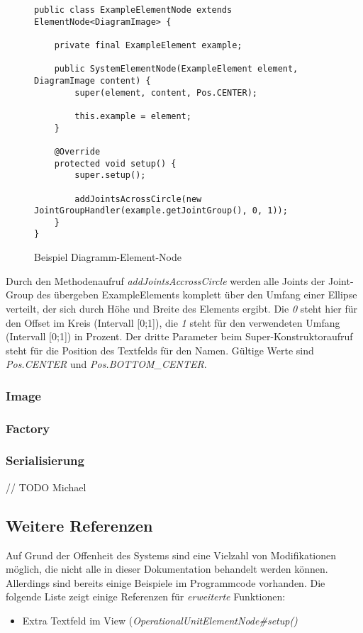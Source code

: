 \begin{figure}[h!]
	\centering
	\begin{lstlisting}
public class ExampleElementNode extends ElementNode<DiagramImage> {

    private final ExampleElement example;

    public SystemElementNode(ExampleElement element, DiagramImage content) {
        super(element, content, Pos.CENTER);

        this.example = element;
    }

    @Override
    protected void setup() {
        super.setup();

        addJointsAcrossCircle(new JointGroupHandler(example.getJointGroup(), 0, 1));
    }
}
	\end{lstlisting}
	\label{diagram_handler}
	\caption{Beispiel Diagramm-Element-Node}
\end{figure}
Durch den Methodenaufruf \textit{addJointsAccrossCircle} werden alle Joints der Joint-Group des übergeben
ExampleElements komplett über den Umfang einer Ellipse verteilt, der sich durch Höhe und Breite des Elements
ergibt. Die \textit{0} steht hier für den Offset im Kreis (Intervall [0;1]), die \textit{1} steht für den
verwendeten Umfang (Intervall [0;1]) in Prozent.
Der dritte Parameter beim Super-Konstruktoraufruf steht für die Position des Textfelds für den Namen. Gültige
Werte sind \textit{Pos.CENTER} und \textit{Pos.BOTTOM\_CENTER}.


\subsubsection{Image}
\subsubsection{Factory}
\subsubsection{Serialisierung}
// TODO Michael

\subsection{Weitere Referenzen}
Auf Grund der Offenheit des Systems sind eine Vielzahl von Modifikationen möglich, die nicht alle in dieser
Dokumentation behandelt werden können. Allerdings sind bereits einige Beispiele im Programmcode vorhanden.
Die folgende Liste zeigt einige Referenzen für \textit{erweiterte} Funktionen:

\begin{itemize}
	\item Extra Textfeld im View (\textit{OperationalUnitElementNode\#setup()}
\end{itemize}